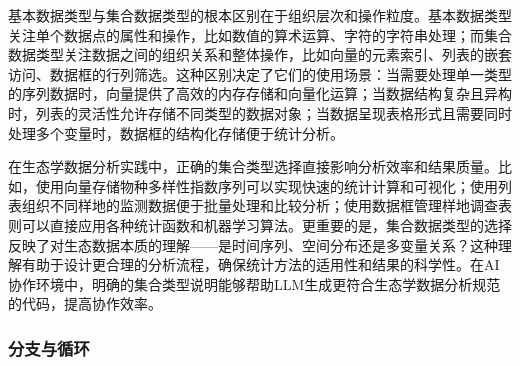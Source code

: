 \documentclass[
]{book}
\begin{document}
基本数据类型与集合数据类型的根本区别在于组织层次和操作粒度。基本数据类型关注单个数据点的属性和操作，比如数值的算术运算、字符的字符串处理；而集合数据类型关注数据之间的组织关系和整体操作，比如向量的元素索引、列表的嵌套访问、数据框的行列筛选。这种区别决定了它们的使用场景：当需要处理单一类型的序列数据时，向量提供了高效的内存存储和向量化运算；当数据结构复杂且异构时，列表的灵活性允许存储不同类型的数据对象；当数据呈现表格形式且需要同时处理多个变量时，数据框的结构化存储便于统计分析。

在生态学数据分析实践中，正确的集合类型选择直接影响分析效率和结果质量。比如，使用向量存储物种多样性指数序列可以实现快速的统计计算和可视化；使用列表组织不同样地的监测数据便于批量处理和比较分析；使用数据框管理样地调查表则可以直接应用各种统计函数和机器学习算法。更重要的是，集合数据类型的选择反映了对生态数据本质的理解------是时间序列、空间分布还是多变量关系？这种理解有助于设计更合理的分析流程，确保统计方法的适用性和结果的科学性。在AI协作环境中，明确的集合类型说明能够帮助LLM生成更符合生态学数据分析规范的代码，提高协作效率。

\hypertarget{ux5206ux652fux4e0eux5faaux73af}{%
\subsubsection{分支与循环}\label{ux5206ux652fux4e0eux5faaux73af}}
\end{document}
